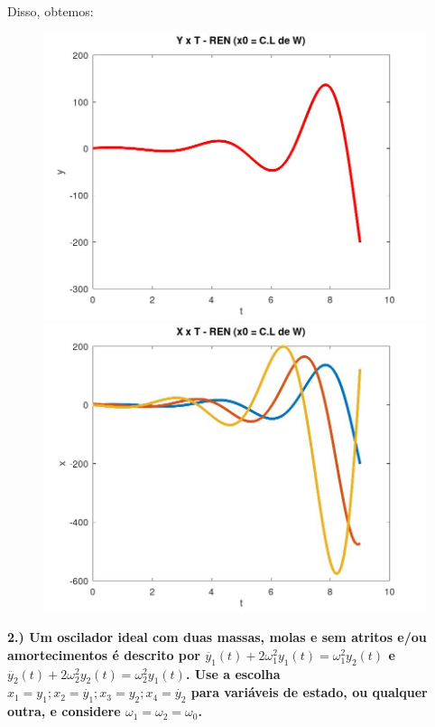 \documentclass[11pt]{article}
\begin{document}
Disso, obtemos:
\begin{center}
  \begin{figure}[h]
  \begin{minipage}[!]{0.5\linewidth}
    \includegraphics[scale=0.3]{plot1g1.jpg}
  \end{minipage}
  \begin{minipage}[!]{0.5\linewidth}
    \includegraphics[scale=0.3]{plot1g2.jpg}
  \end{minipage}
  \end{figure}
\end{center}


\textbf{2.) Um oscilador ideal com duas massas, molas e sem atritos e/ou amortecimentos é descrito por $\ddot{y_1}(t) + 2\omega_1^2 y_1(t) = \omega_1^2 y_2(t)$ e $\ddot{y_2}(t) + 2\omega_2^2 y_2(t) = \omega_2^2 y_1(t)$. Use a escolha $x_1 = y_1; x_2 = \dot{y_1}; x_3 = y_2; x_4 = \dot{y_2}$ para variáveis de estado, ou qualquer outra, e considere $\omega_1 = \omega_2 = \omega_0$.}
\end{document}
